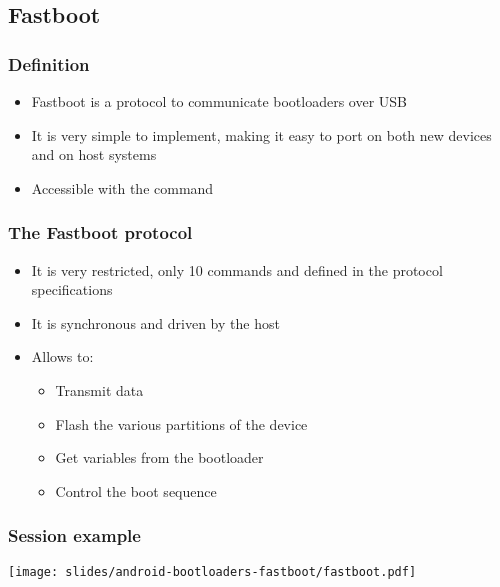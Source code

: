 \subsection{Fastboot}
\begin{frame}
  \frametitle{Definition}
  \begin{itemize}
  \item Fastboot is a protocol to communicate bootloaders over
    USB
  \item It is very simple to implement, making it easy to port on
    both new devices and on host systems
  \item Accessible with the  command
  \end{itemize}
\end{frame}

\begin{frame}
  \frametitle{The Fastboot protocol}
  \begin{itemize}
  \item It is very restricted, only 10 commands and defined in the
    protocol specifications
  \item It is synchronous and driven by the host
  \item Allows to:
    \begin{itemize}
      \item Transmit data
      \item Flash the various partitions of the device
      \item Get variables from the bootloader
      \item Control the boot sequence
    \end{itemize}
  \end{itemize}
\end{frame}

\begin{frame}
  \frametitle{Session example}
  \begin{center}
    \texttt{[image: slides/android-bootloaders-fastboot/fastboot.pdf]}
  \end{center}
\end{frame}

